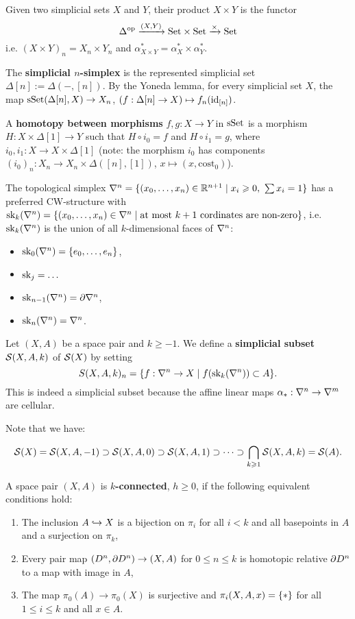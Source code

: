 

Given two simplicial sets $X$ and $Y$, their product $X\times Y$ is the functor \[\Delta^\op\xto{(X,Y)}\Set\times\Set\xto{\times}\Set\] i.e. $(X\times Y)_n=X_n\times Y_n$ and $\alpha^*_{X\times Y}=\alpha^*_X\times\alpha^*_Y$.

The \textbf{simplicial $n$-simplex} is the represented simplicial set $\Delta[n]:=\Delta(-,[n])$. By the Yoneda lemma, for every simplicial set $X$, the map $\sSet(\Delta[n],X)\to X_n$, $(f:\Delta[n]\to X)\mapsto f_n(\id_{[n]})$.

A \textbf{homotopy between morphisms} $f,g:X\to Y$ in $\sSet$ is a morphism $H:X\times\Delta[1]\to Y$ such that $H\circ i_0=f$ and $H\circ i_1=g$, where $i_0,i_1:X\to X\times\Delta[1]$ (note: the morphism $i_0$ has components $(i_0)_n:X_n\to X_n\times\Delta([n],[1])$, $x\mapsto(x,\text{cost}_0)$).

The topological simplex $\nabla^n=\cb{(\xso)\in\R^{n+1}\mid x_i\geq0,\ \sum x_i=1}$ has a preferred CW-structure with $\sk_k(\nabla^n)=\cb{(\xso)\in\nabla^n\mid\text{at most }k+1\text{ cordinates are non-zero}}$, i.e. $\sk_k(\ns)$ is the union of all $k$-dimensional faces of $\ns$:
\begin{itemize}
    \item $\sk_0(\nabla^n)=\cb{\nno{e}{n}}$,
    \item $\sk_j=\dots$
    \item $\sk_{n-1}(\nabla^n)=\de\nabla^n$,
    \item $\sk_n(\nabla^n)=\nabla^n$.
\end{itemize}\medskip

Let $(X,A)$ be a space pair and $k\geq-1$. We define a \textbf{simplicial subset} $\S(X,A,k)$ of $\S(X)$ by setting
\[S(X,A,k)_n=\cb{f:\ns\to X\mid f(\sk_k(\ns))\subset A}.\]
This is indeed a simplicial subset because the affine linear maps $\alpha_*:\ns\to\ms$ are cellular.

Note that we have:

\[\S(X)=\S(X,A,-1)\supset \S(X,A,0)\supset \S(X,A,1)\supset\dots\supset\bigcap_{k\geq1}\S(X,A,k)=\S(A).\]

A space pair $(X,A)$ is \textbf{$k$-connected}, $h\geq0$, if the following equivalent conditions hold:
\begin{enumerate}[label={(\alph*)},topsep=0.5\thmsep]
    \item The inclusion $A\hto X$ is a bijection on $\pi_i$ for all $i<k$ and all basepoints in $A$ and a surjection on $\pi_k$,
    \item Every pair map $(D^n,\de D^n)\to (X,A)$ for $0\leq n\leq k$ is homotopic relative $\de D^n$ to a map with image in $A$,
    \item The map $\pi_0(A)\to \pi_0(X)$ is surjective and $\pi_i(X,A,x)=\cb{*}$ for all $1\leq i\leq k$ and all $x\in A$.
\end{enumerate}

